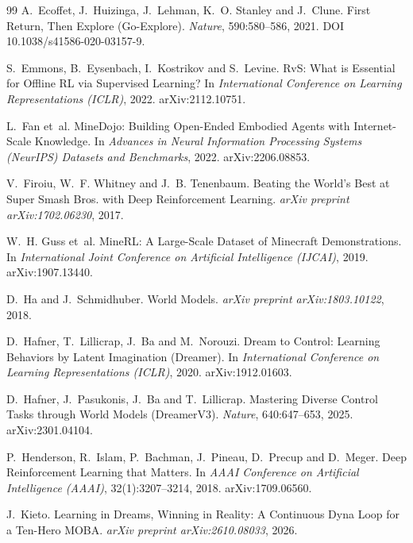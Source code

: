 \documentclass[11pt]{article}
\begin{document}
\begin{thebibliography}{99}
A.~Ecoffet, J.~Huizinga, J.~Lehman, K.~O. Stanley and J.~Clune.
\newblock First Return, Then Explore (Go-Explore).
\newblock \emph{Nature}, 590:580--586, 2021. DOI 10.1038/s41586-020-03157-9.

S.~Emmons, B.~Eysenbach, I.~Kostrikov and S.~Levine.
\newblock RvS: What is Essential for Offline RL via Supervised Learning?
\newblock In \emph{International Conference on Learning Representations (ICLR)}, 2022. arXiv:2112.10751.

L.~Fan et~al.
\newblock MineDojo: Building Open-Ended Embodied Agents with Internet-Scale Knowledge.
\newblock In \emph{Advances in Neural Information Processing Systems (NeurIPS) Datasets and Benchmarks}, 2022. arXiv:2206.08853.

V.~Firoiu, W.~F. Whitney and J.~B. Tenenbaum.
\newblock Beating the World's Best at Super Smash Bros. with Deep Reinforcement Learning.
\newblock \emph{arXiv preprint arXiv:1702.06230}, 2017.

W.~H. Guss et~al.
\newblock MineRL: A Large-Scale Dataset of Minecraft Demonstrations.
\newblock In \emph{International Joint Conference on Artificial Intelligence (IJCAI)}, 2019. arXiv:1907.13440.

D.~Ha and J.~Schmidhuber.
\newblock World Models.
\newblock \emph{arXiv preprint arXiv:1803.10122}, 2018.

D.~Hafner, T.~Lillicrap, J.~Ba and M.~Norouzi.
\newblock Dream to Control: Learning Behaviors by Latent Imagination (Dreamer).
\newblock In \emph{International Conference on Learning Representations (ICLR)}, 2020. arXiv:1912.01603.

D.~Hafner, J.~Pasukonis, J.~Ba and T.~Lillicrap.
\newblock Mastering Diverse Control Tasks through World Models (DreamerV3).
\newblock \emph{Nature}, 640:647--653, 2025. arXiv:2301.04104.

P.~Henderson, R.~Islam, P.~Bachman, J.~Pineau, D.~Precup and D.~Meger.
\newblock Deep Reinforcement Learning that Matters.
\newblock In \emph{AAAI Conference on Artificial Intelligence (AAAI)}, 32(1):3207--3214, 2018. arXiv:1709.06560.

J.~Kieto.
\newblock Learning in Dreams, Winning in Reality: A Continuous Dyna Loop for a Ten-Hero MOBA.
\newblock \emph{arXiv preprint arXiv:2610.08033}, 2026.


\end{thebibliography}
\end{document}
